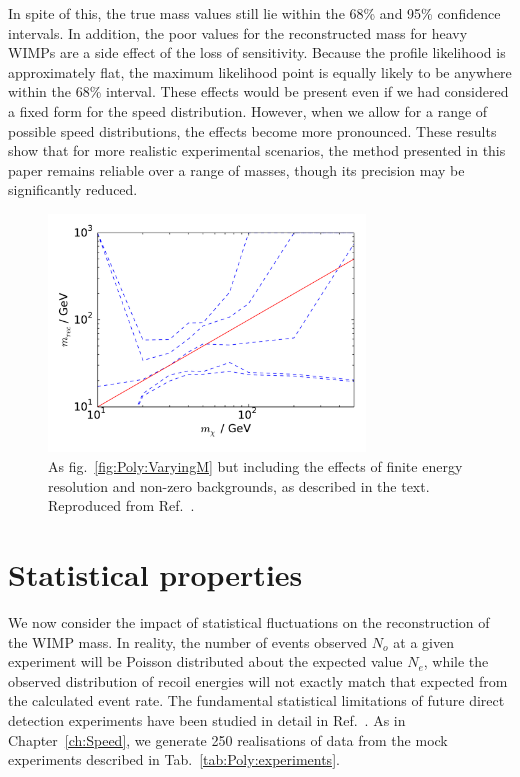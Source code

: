 In spite of this, the true mass values still lie within the 68\% and 95\% confidence intervals. In addition, the poor values for the reconstructed mass for heavy WIMPs are a side effect of the loss of sensitivity. Because the profile likelihood is approximately flat, the maximum likelihood point is equally likely to be anywhere within the 68\% interval. These effects would be present even if we had considered a fixed form for the speed distribution. However, when we allow for a range of possible speed distributions, the effects become more pronounced. These results show that for more realistic experimental scenarios, the method presented in this paper remains reliable over a range of masses, though its precision may be significantly reduced.

\begin{figure}[t]
\centering
  \includegraphics[width=0.75\textwidth]{Poly/VaryingM_real.pdf}
  \caption[Reconstructed WIMP mass as a function of input WIMP mass for experiments including the effects of finite backgrounds and energy resolution]{As fig.~\ref{fig:Poly:VaryingM} but including the effects of finite energy resolution and non-zero backgrounds, as described in the text. Reproduced from Ref.~\cite{Kavanagh:2014}.}
  \label{fig:Poly:VaryingM_real}
\end{figure}

\section{Statistical properties}
\label{sec:Poly:stats}


We now consider the impact of statistical fluctuations on the reconstruction of the WIMP mass. In reality, the number of events observed $N_o$ at a given experiment will be Poisson distributed about the expected value $N_e$, while the observed distribution of recoil energies will not exactly match that expected from the calculated event rate. The fundamental statistical limitations of future direct detection experiments have been studied in detail in Ref.~\cite{Strege:2012}. As in Chapter~\ref{ch:Speed}, we generate 250 realisations of data from the mock experiments described in Tab.~\ref{tab:Poly:experiments}.

